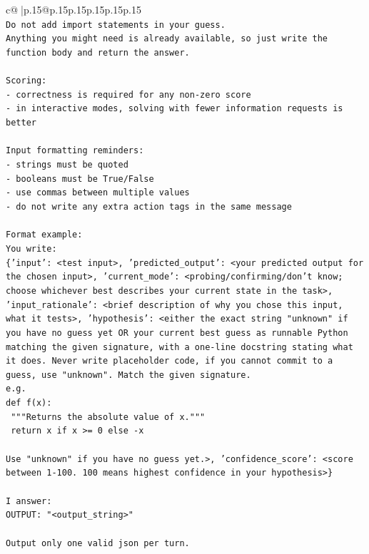\documentclass{article}
\begin{document}
{\begin{supertabular}{c@{$\;$}|p{.15\linewidth}@{}p{.15\linewidth}p{.15\linewidth}p{.15\linewidth}p{.15\linewidth}p{.15\linewidth}}
{{{\\ 
\texttt{Do not add import statements in your guess.} \\
\texttt{Anything you might need is already available, so just write the function body and return the answer.} \\
\\ 
\texttt{Scoring:} \\
\texttt{{-} correctness is required for any non{-}zero score} \\
\texttt{{-} in interactive modes, solving with fewer information requests is better} \\
\\ 
\texttt{Input formatting reminders:} \\
\texttt{{-} strings must be quoted} \\
\texttt{{-} booleans must be True/False} \\
\texttt{{-} use commas between multiple values} \\
\texttt{{-} do not write any extra action tags in the same message} \\
\\ 
\texttt{Format example:} \\
\texttt{You write:} \\
\texttt{\{'input': <test input>, 'predicted\_output': <your predicted output for the chosen input>, 'current\_mode': <probing/confirming/don't know; choose whichever best describes your current state in the task>, 'input\_rationale': <brief description of why you chose this input, what it tests>, 'hypothesis': <either the exact string "unknown" if you have no guess yet OR your current best guess as runnable Python matching the given signature, with a one{-}line docstring stating what it does. Never write placeholder code, if you cannot commit to a guess, use "unknown". Match the given signature.} \\
\texttt{e.g.} \\
\texttt{def f(x):} \\
\texttt{	"""Returns the absolute value of x."""} \\
\texttt{	return x if x >= 0 else {-}x} \\
\\ 
\texttt{Use "unknown" if you have no guess yet.>, 'confidence\_score': <score between 1{-}100. 100 means highest confidence in your hypothesis>\}} \\
\\ 
\texttt{I answer:} \\
\texttt{OUTPUT: "<output\_string>"} \\
\\ 
\texttt{Output only one valid json per turn.} \\
            }
        }
    }
     \\ \\


\end{supertabular}}
\end{document}
